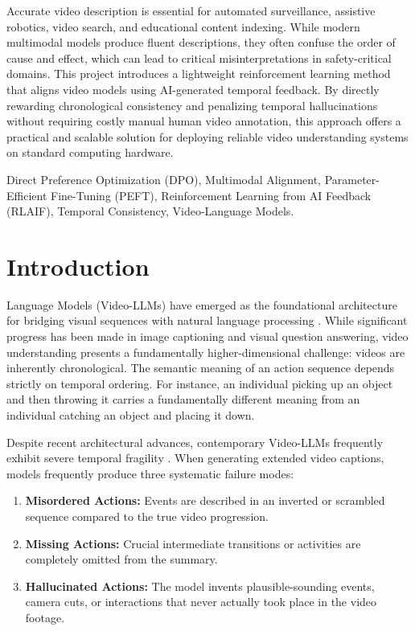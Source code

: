 \documentclass[journal]{IEEEtai}
\begin{document}
\begin{IEEEImpStatement}
Accurate video description is essential for automated surveillance, assistive robotics, video search, and educational content indexing. While modern multimodal models produce fluent descriptions, they often confuse the order of cause and effect, which can lead to critical misinterpretations in safety-critical domains. This project introduces a lightweight reinforcement learning method that aligns video models using AI-generated temporal feedback. By directly rewarding chronological consistency and penalizing temporal hallucinations without requiring costly manual human video annotation, this approach offers a practical and scalable solution for deploying reliable video understanding systems on standard computing hardware.
\end{IEEEImpStatement}

\begin{IEEEkeywords}
Direct Preference Optimization (DPO), Multimodal Alignment, Parameter-Efficient Fine-Tuning (PEFT), Reinforcement Learning from AI Feedback (RLAIF), Temporal Consistency, Video-Language Models.
\end{IEEEkeywords}

\section{Introduction}
 Language Models (Video-LLMs) have emerged as the foundational architecture for bridging visual sequences with natural language processing \cite{ahn2024vlm,hu2025timejudge}. While significant progress has been made in image captioning and visual question answering, video understanding presents a fundamentally higher-dimensional challenge: videos are inherently chronological. The semantic meaning of an action sequence depends strictly on temporal ordering. For instance, an individual picking up an object and then throwing it carries a fundamentally different meaning from an individual catching an object and placing it down.

Despite recent architectural advances, contemporary Video-LLMs frequently exhibit severe temporal fragility \cite{hu2025timejudge,hu2026evocap}. When generating extended video captions, models frequently produce three systematic failure modes:
\begin{enumerate}
    \item \textbf{Misordered Actions:} Events are described in an inverted or scrambled sequence compared to the true video progression.
    \item \textbf{Missing Actions:} Crucial intermediate transitions or activities are completely omitted from the summary.
    \item \textbf{Hallucinated Actions:} The model invents plausible-sounding events, camera cuts, or interactions that never actually took place in the video footage.
\end{enumerate}
\end{document}
